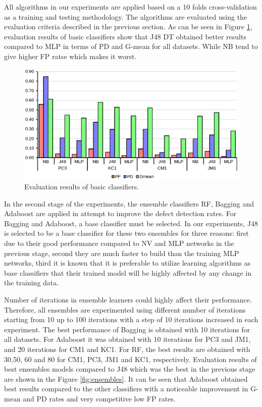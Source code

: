 \documentclass[runningheads,a4paper]{llncs}
\begin{document}
All algorithms in our experiments are applied based on a 10 folds cross-validation as a training and testing methodology. The algorithms are evaluated using the evaluation criteria described in the previous section. As can be seen in Figure  \ref{fig:basic}, evaluation results of basic classifiers show that J48 DT obtained better results compared to MLP in terms of PD and G-mean for all datasets. While NB tend to give higher FP ratse which makes it worst. 



\begin{figure}[h]
\label{fig:ss}
\begin{center}
\includegraphics[scale=0.6]{basicresults.eps}
\caption{Evaluation results of basic classifiers.}
\end{center}
\label{fig:basic}
\end{figure}


In the second stage of the experiments, the ensemble classifiers RF, Bagging and Adaboost are applied in attempt to improve the defect detection rates. For Bagging and Adaboost, a base classifier must be selected. In our experiments, J48 is selected to be a base classifier for these two ensembles for three reasons: first due to their good performance compared to NV and MLP networks in the previous stage, second they are much faster to build than the training MLP networks, third it is known that it is preferable to utilize learning algorithms as base classifiers that their trained model will be highly affected by any change in the training data. 

Number of iterations in ensemble learners could highly affect their performance. Therefore, all ensembles are experimented using different number of iterations starting from 10 up to 100 iterations with a step of 10 iterations increased in each experiment. The best performance of Bagging is obtained with 10 iterations for all datasets. For Adaboost it was obtained with 10 iterations for PC3 and JM1, and 20 iterations for CM1 and KC1. For RF, the best results are obtained with 30,50, 60 and 80 for CM1, PC3, JM1 and KC1, respectively. Evaluation results of best ensembles models compared to J48 which was the best in the previous stage are shown in the Figure \ref{fig:ensembles}. It can be seen that Adaboost obtained best results compared to the other classifiers with a noticeable improvement in G-mean and PD rates and very competitive low FP rates.
\end{document}
